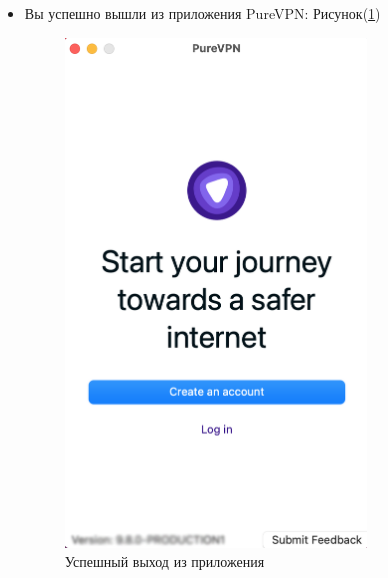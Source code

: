 \begin{itemize}
\item Вы успешно вышли из приложения PureVPN:  Рисунок(\ref{fig:36})
\begin{figure}[H]
\includegraphics[width=8cm]{24.png}
\centering
\caption{Успешный выход из приложения}
\label{fig:36}
\end{figure}
\end{itemize}

